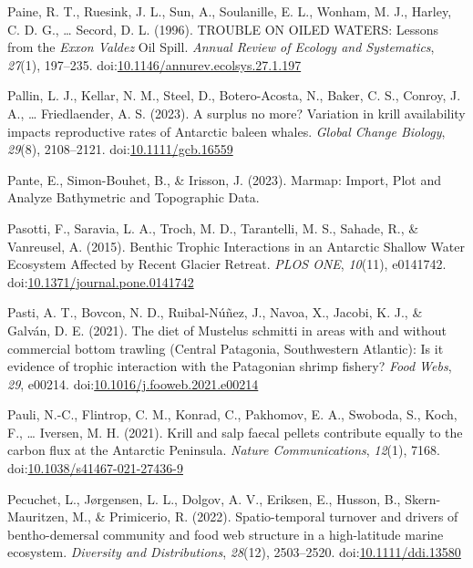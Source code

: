 \documentclass[
]{article}
\newlength{\cslhangindent}
\newlength{\cslentryspacingunit} %
\newenvironment{CSLReferences}[2] %
 {%
  \setlength{\parindent}{0pt}
  \ifodd #1
  \let\oldpar\par
  \def\par{\hangindent=\cslhangindent\oldpar}
  \fi
  \setlength{\parskip}{#2\cslentryspacingunit}
 }%
 {}
\begin{document}
\begin{CSLReferences}{1}{0}
\leavevmode{}%
Paine, R. T., Ruesink, J. L., Sun, A., Soulanille, E. L., Wonham, M. J.,
Harley, C. D. G., \ldots{} Secord, D. L. (1996). {TROUBLE ON OILED
WATERS}: {Lessons} from the {\emph{Exxon Valdez}} {Oil Spill}.
\emph{Annual Review of Ecology and Systematics}, \emph{27}(1), 197--235.
doi:\href{https://doi.org/10.1146/annurev.ecolsys.27.1.197}{10.1146/annurev.ecolsys.27.1.197}

\leavevmode{}%
Pallin, L. J., Kellar, N. M., Steel, D., Botero-Acosta, N., Baker, C.
S., Conroy, J. A., \ldots{} Friedlaender, A. S. (2023). A surplus no
more? {Variation} in krill availability impacts reproductive rates of
{Antarctic} baleen whales. \emph{Global Change Biology}, \emph{29}(8),
2108--2121.
doi:\href{https://doi.org/10.1111/gcb.16559}{10.1111/gcb.16559}

\leavevmode{}%
Pante, E., Simon-Bouhet, B., \& Irisson, J. (2023). Marmap: {Import},
{Plot} and {Analyze Bathymetric} and {Topographic Data}.

\leavevmode{}%
Pasotti, F., Saravia, L. A., Troch, M. D., Tarantelli, M. S., Sahade,
R., \& Vanreusel, A. (2015). Benthic {Trophic Interactions} in an
{Antarctic Shallow Water Ecosystem Affected} by {Recent Glacier
Retreat}. \emph{PLOS ONE}, \emph{10}(11), e0141742.
doi:\href{https://doi.org/10.1371/journal.pone.0141742}{10.1371/journal.pone.0141742}

\leavevmode{}%
Pasti, A. T., Bovcon, N. D., Ruibal-Núñez, J., Navoa, X., Jacobi, K. J.,
\& Galván, D. E. (2021). The diet of {Mustelus} schmitti in areas with
and without commercial bottom trawling ({Central Patagonia},
{Southwestern Atlantic}): {Is} it evidence of trophic interaction with
the {Patagonian} shrimp fishery? \emph{Food Webs}, \emph{29}, e00214.
doi:\href{https://doi.org/10.1016/j.fooweb.2021.e00214}{10.1016/j.fooweb.2021.e00214}

\leavevmode{}%
Pauli, N.-C., Flintrop, C. M., Konrad, C., Pakhomov, E. A., Swoboda, S.,
Koch, F., \ldots{} Iversen, M. H. (2021). Krill and salp faecal pellets
contribute equally to the carbon flux at the {Antarctic Peninsula}.
\emph{Nature Communications}, \emph{12}(1), 7168.
doi:\href{https://doi.org/10.1038/s41467-021-27436-9}{10.1038/s41467-021-27436-9}

\leavevmode{}%
Pecuchet, L., Jørgensen, L. L., Dolgov, A. V., Eriksen, E., Husson, B.,
Skern-Mauritzen, M., \& Primicerio, R. (2022). Spatio-temporal turnover
and drivers of bentho-demersal community and food web structure in a
high-latitude marine ecosystem. \emph{Diversity and Distributions},
\emph{28}(12), 2503--2520.
doi:\href{https://doi.org/10.1111/ddi.13580}{10.1111/ddi.13580}


\end{CSLReferences}
\end{document}
